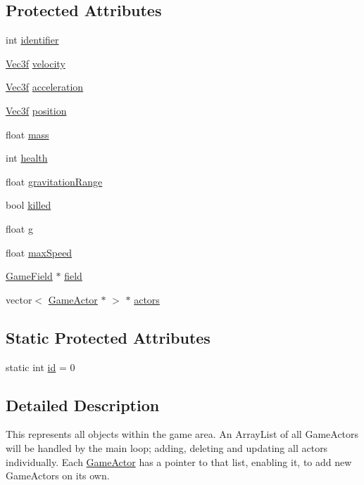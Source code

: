 \subsection*{Protected Attributes}
\begin{DoxyCompactItemize}
\item 
int \hyperlink{class_game_actor_af0f1723601974c63c9df8a60a6ce7da7}{identifier}
\item 
\hyperlink{class_vec3f}{Vec3f} \hyperlink{class_game_actor_a95518bf01411eafe983df8815e8682d1}{velocity}
\item 
\hyperlink{class_vec3f}{Vec3f} \hyperlink{class_game_actor_aa62fdbdad09045bcd6f3a150c3a0038b}{acceleration}
\item 
\hyperlink{class_vec3f}{Vec3f} \hyperlink{class_game_actor_aefed3c91bf32ad388d86657b3bb9ddfa}{position}
\item 
float \hyperlink{class_game_actor_a2111233f4f0216db4d172d5088ebeed4}{mass}
\item 
int \hyperlink{class_game_actor_a5d402a953140585fb7cc3f8a3a24a2a4}{health}
\item 
float \hyperlink{class_game_actor_a9c0ba51b08a3e617d9629c0ee8d309f2}{gravitation\+Range}
\item 
bool \hyperlink{class_game_actor_a7f8bd5ef8278fda5db77a372d8bb6bb9}{killed}
\item 
float \hyperlink{class_game_actor_a42ed4bef0d99cf053ff9a025c86d34d3}{g}
\item 
float \hyperlink{class_game_actor_a15b6abd006c52b21c569932f8b484eb0}{max\+Speed}
\item 
\hyperlink{class_game_field}{Game\+Field} $\ast$ \hyperlink{class_game_actor_a0224fbc502abd6b7579787aa234332d5}{field}
\item 
vector$<$ \hyperlink{class_game_actor}{Game\+Actor} $\ast$ $>$ $\ast$ \hyperlink{class_game_actor_a2405618d895f5143b42ae9e94d20e693}{actors}
\end{DoxyCompactItemize}
\subsection*{Static Protected Attributes}
\begin{DoxyCompactItemize}
\item 
static int \hyperlink{class_game_actor_a07be525e1e463a4f437dba30f0173b6c}{id} = 0
\end{DoxyCompactItemize}


\subsection{Detailed Description}
This represents all objects within the game area. An Array\+List of all Game\+Actors will be handled by the main loop; adding, deleting and updating all actors individually. Each \hyperlink{class_game_actor}{Game\+Actor} has a pointer to that list, enabling it, to add new Game\+Actors on its own. 

